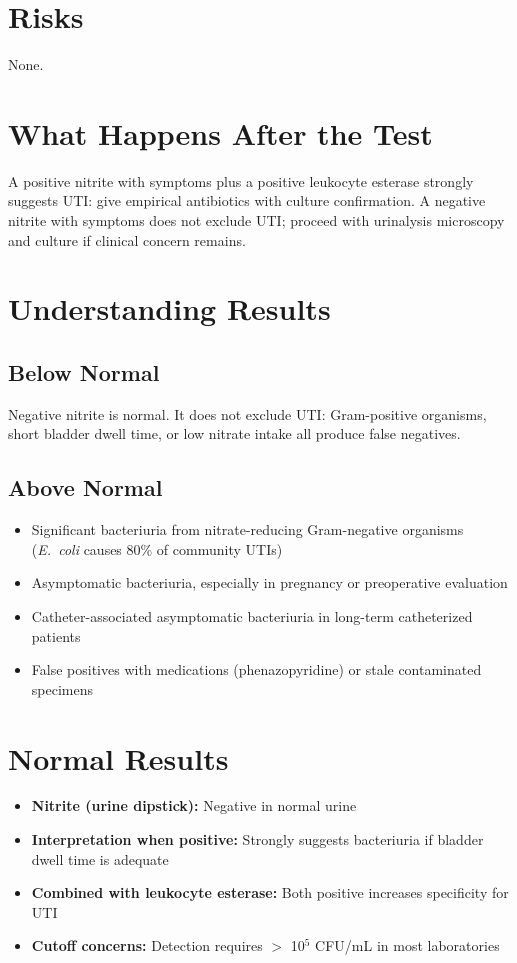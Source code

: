 \section*{Risks}
None.

\section*{What Happens After the Test}
A positive nitrite with symptoms plus a positive leukocyte esterase strongly suggests UTI: give empirical antibiotics with culture confirmation. A negative nitrite with symptoms does not exclude UTI; proceed with urinalysis microscopy and culture if clinical concern remains.

\section*{Understanding Results}

\subsection*{Below Normal}
Negative nitrite is normal. It does not exclude UTI: Gram-positive organisms, short bladder dwell time, or low nitrate intake all produce false negatives.

\subsection*{Above Normal}
\begin{itemize}
  \item Significant bacteriuria from nitrate-reducing Gram-negative organisms (\textit{E.\ coli} causes 80\% of community UTIs) \cite{hooton2020acute}
  \item Asymptomatic bacteriuria, especially in pregnancy or preoperative evaluation
  \item Catheter-associated asymptomatic bacteriuria in long-term catheterized patients
  \item False positives with medications (phenazopyridine) or stale contaminated specimens
\end{itemize}

\section*{Normal Results}
\begin{itemize}
  \item \textbf{Nitrite (urine dipstick):} Negative in normal urine
  \item \textbf{Interpretation when positive:} Strongly suggests bacteriuria if bladder dwell time is adequate
  \item \textbf{Combined with leukocyte esterase:} Both positive increases specificity for UTI
  \item \textbf{Cutoff concerns:} Detection requires $>$ 10$^5$ CFU/mL in most laboratories
\end{itemize}

